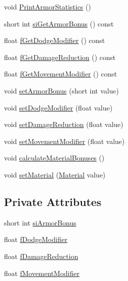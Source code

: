 \begin{DoxyCompactItemize}
void \mbox{\hyperlink{class_armor_a248a63d0d2801a10d6a4039f60b6a0c7}{Print\+Armor\+Statistics}} ()
\item 
short int \mbox{\hyperlink{class_armor_a72b3d5c0294e80243ed8c96dbc35ccc7}{si\+Get\+Armor\+Bonus}} () const
\item 
float \mbox{\hyperlink{class_armor_a2eab88550e74345eef13e2a279a2f995}{f\+Get\+Dodge\+Modifier}} () const
\item 
float \mbox{\hyperlink{class_armor_a2ac47305b38298494fae82c69c935fba}{f\+Get\+Damage\+Reduction}} () const
\item 
float \mbox{\hyperlink{class_armor_a788fee5745a82a7ffc587aa4938200dc}{f\+Get\+Movement\+Modifier}} () const
\item 
void \mbox{\hyperlink{class_armor_a14c15f72741f2a3dec28c746b3678c20}{set\+Armor\+Bonus}} (short int value)
\item 
void \mbox{\hyperlink{class_armor_ab48309e3f16d226d56af617c65350698}{set\+Dodge\+Modifier}} (float value)
\item 
void \mbox{\hyperlink{class_armor_a08f926ae8438bae04058c22b098c6fcf}{set\+Damage\+Reduction}} (float value)
\item 
void \mbox{\hyperlink{class_armor_a99475fc688add41f89b7fef160534e33}{set\+Movement\+Modifier}} (float value)
\item 
void \mbox{\hyperlink{class_armor_ac86ccbc735cc83849f1c62099285a0c9}{calculate\+Material\+Bonuses}} ()
\item 
void \mbox{\hyperlink{class_armor_a1710521cbba1bf9328e969cbbc8cdbf3}{set\+Material}} (\mbox{\hyperlink{class_material}{Material}} value)
\end{DoxyCompactItemize}
\subsection*{Private Attributes}
\begin{DoxyCompactItemize}
\item 
short int \mbox{\hyperlink{class_armor_a2ebccb72313c650ec1b8bafec4e82dc2}{si\+Armor\+Bonus}}
\item 
float \mbox{\hyperlink{class_armor_aed2f98ba9acefdb67ac75104c55ea266}{f\+Dodge\+Modifier}}
\item 
float \mbox{\hyperlink{class_armor_acc29c5818b294aaaa11d8d1621b7dd19}{f\+Damage\+Reduction}}
\item 
float \mbox{\hyperlink{class_armor_aa71e430d9308cfe64b5168014c063722}{f\+Movement\+Modifier}}
\end{DoxyCompactItemize}
